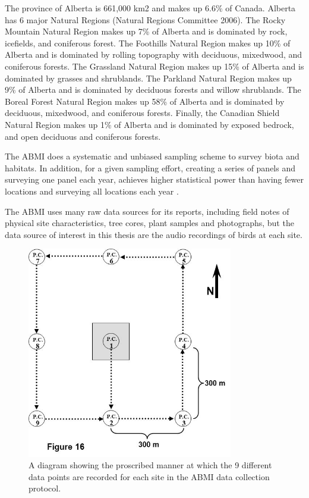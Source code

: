 \documentclass[12pt,oneside]{book}
\begin{document}
The province of Alberta is 661,000 km2 and makes up 6.6\% of
Canada. Alberta has 6 major Natural Regions (Natural Regions Committee
2006). The Rocky Mountain Natural Region makes up 7\% of Alberta and
is dominated by rock, icefields, and coniferous forest. The Foothills
Natural Region makes up 10\% of Alberta and is dominated by rolling
topography with deciduous, mixedwood, and coniferous forests. The
Grassland Natural Region makes up 15\% of Alberta and is dominated by
grasses and shrublands. The Parkland Natural Region makes up 9\% of
Alberta and is dominated by deciduous forests and willow
shrublands. The Boreal Forest Natural Region makes up 58\% of Alberta
and is dominated by deciduous, mixedwood, and coniferous
forests. Finally, the Canadian Shield Natural Region makes up 1\% of
Alberta and is dominated by exposed bedrock, and open deciduous and
coniferous forests.

The ABMI does a systematic and unbiased sampling scheme to survey
biota and habitats.  In addition, for a given sampling effort,
creating a series of panels and surveying one panel each year,
achieves higher statistical power than having fewer locations and
surveying all locations each year \cite{urquhart1998monitoring}
\cite{urquhart1999designs}.

The ABMI uses many raw data sources for its reports, including field
notes of physical site characteristics, tree cores, plant samples and
photographs, but the data source of interest in this thesis are the
audio recordings of birds at each site.

\begin{figure}[h]
\centering
\includegraphics[width=90mm]{figures/abmiGrid.jpg}
\caption{A diagram showing the proscribed manner at which the 9
  different data points are recorded for each site in the ABMI data
  collection protocol.}
\label{fig:abmiGrid}
\end{figure}
\end{document}
